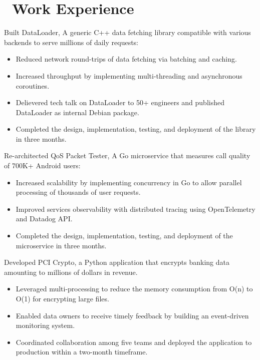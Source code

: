 \documentclass{resume}
\begin{document}
\section{\faUsers\ Work Experience}
Built DataLoader, A generic C++ data fetching library compatible with various backends to serve millions of daily requests:
\begin{itemize}
  \item {Reduced network round-trips of data fetching via batching and caching.}
  \item {Increased throughput by implementing multi-threading and asynchronous coroutines.}
  \item {Delievered  tech talk on DataLoader to 50+ engineers and published DataLoader as internal Debian package.}
  \item {Completed the design, implementation, testing, and deployment of the library in three months.}
\end{itemize}

Re-architected QoS Packet Tester, A Go microservice that measures call quality of 700K+ Android users:
\begin{itemize}
  \item {Increased scalability by implementing concurrency in Go to allow parallel processing of thousands of user requests.}
  \item {Improved services observability with distributed tracing using OpenTelemetry and Datadog API.}
  \item {Completed the design, implementation, testing, and deployment of the microservice in three months.}
\end{itemize}

Developed PCI Crypto, a Python application that encrypts banking data amounting to millions of dollars in revenue.
\begin{itemize}
  \item {Leveraged multi-processing to reduce the memory consumption from O(n) to O(1) for encrypting large files.}
  \item {Enabled data owners to receive timely feedback by building an event-driven monitoring system.}
  \item {Coordinated collaboration among five teams and deployed the application to production within a two-month timeframe.}
\end{itemize}
\end{document}
